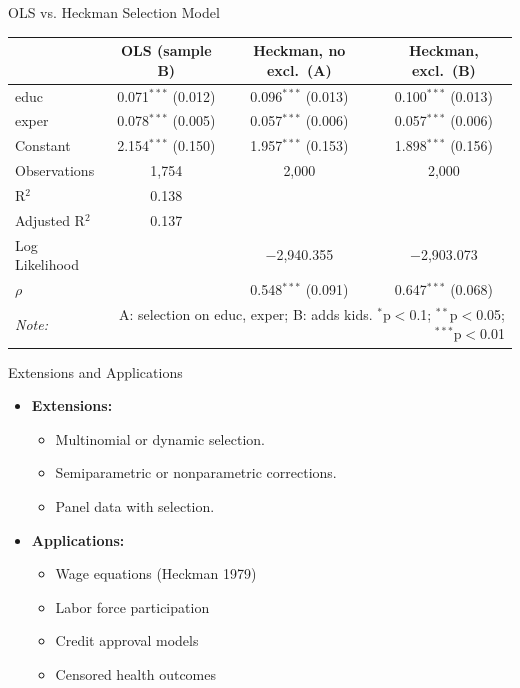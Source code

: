 \documentclass[aspectratio=169,11pt]{beamer}
\begin{document}
\begin{frame}{OLS vs. Heckman Selection Model}
\begin{center}
\begin{tabular}{@{\extracolsep{5pt}}lccc} 
\toprule
 & OLS (sample B) & Heckman, no excl.\ (A) & Heckman, excl.\ (B) \\ 
\midrule
 educ & 0.071$^{***}$ (0.012) & 0.096$^{***}$ (0.013) & 0.100$^{***}$ (0.013) \\ 
  exper & 0.078$^{***}$ (0.005) & 0.057$^{***}$ (0.006) & 0.057$^{***}$ (0.006) \\ 
  Constant & 2.154$^{***}$ (0.150) & 1.957$^{***}$ (0.153) & 1.898$^{***}$ (0.156) \\ 
\midrule
Observations & 1,754 & 2,000 & 2,000 \\ 
R$^{2}$ & 0.138 &  &  \\ 
Adjusted R$^{2}$ & 0.137 &  &  \\ 
Log Likelihood &  & $-$2,940.355 & $-$2,903.073 \\ 
$\rho$ &  & 0.548$^{***}$  (0.091) & 0.647$^{***}$  (0.068) \\ 
\bottomrule 
\textit{Note:}  & \multicolumn{3}{r}{A: selection on educ, exper; B: adds kids. $^{*}$p$<$0.1; $^{**}$p$<$0.05; $^{***}$p$<$0.01} \\
\end{tabular} 
\end{center}
\end{frame}



\begin{frame}{Extensions and Applications}
\begin{itemize}
    \item \textbf{Extensions:}
    \begin{itemize}
        \item Multinomial or dynamic selection.
        \item Semiparametric or nonparametric corrections.
        \item Panel data with selection.
    \end{itemize}
    \item \textbf{Applications:}
    \begin{itemize}
        \item Wage equations (Heckman 1979)
        \item Labor force participation
        \item Credit approval models
        \item Censored health outcomes
    \end{itemize}
\end{itemize}
\end{frame}
\end{document}
